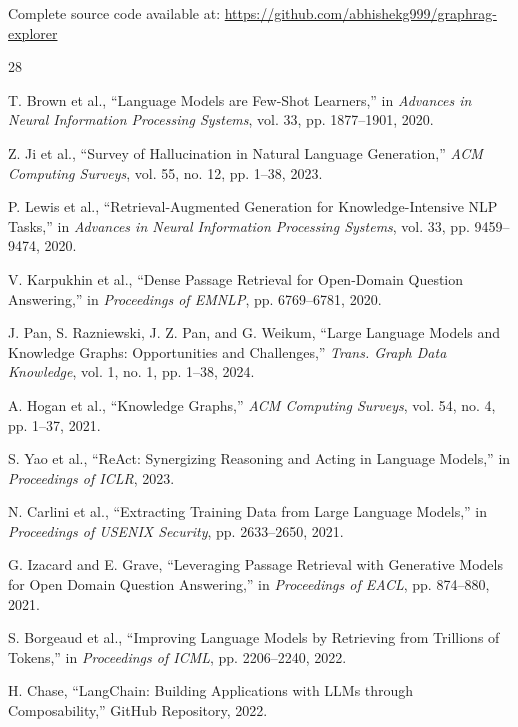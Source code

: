 \documentclass[conference]{IEEEtran}
\begin{document}
Complete source code available at: \url{https://github.com/abhishekg999/graphrag-explorer}


\begin{thebibliography}{28}

T. Brown et al., ``Language Models are Few-Shot Learners,'' in \textit{Advances in Neural Information Processing Systems}, vol. 33, pp. 1877--1901, 2020.

Z. Ji et al., ``Survey of Hallucination in Natural Language Generation,'' \textit{ACM Computing Surveys}, vol. 55, no. 12, pp. 1--38, 2023.

P. Lewis et al., ``Retrieval-Augmented Generation for Knowledge-Intensive NLP Tasks,'' in \textit{Advances in Neural Information Processing Systems}, vol. 33, pp. 9459--9474, 2020.

V. Karpukhin et al., ``Dense Passage Retrieval for Open-Domain Question Answering,'' in \textit{Proceedings of EMNLP}, pp. 6769--6781, 2020.

J. Pan, S. Razniewski, J. Z. Pan, and G. Weikum, ``Large Language Models and Knowledge Graphs: Opportunities and Challenges,'' \textit{Trans. Graph Data Knowledge}, vol. 1, no. 1, pp. 1--38, 2024.

A. Hogan et al., ``Knowledge Graphs,'' \textit{ACM Computing Surveys}, vol. 54, no. 4, pp. 1--37, 2021.

S. Yao et al., ``ReAct: Synergizing Reasoning and Acting in Language Models,'' in \textit{Proceedings of ICLR}, 2023.

N. Carlini et al., ``Extracting Training Data from Large Language Models,'' in \textit{Proceedings of USENIX Security}, pp. 2633--2650, 2021.

G. Izacard and E. Grave, ``Leveraging Passage Retrieval with Generative Models for Open Domain Question Answering,'' in \textit{Proceedings of EACL}, pp. 874--880, 2021.

S. Borgeaud et al., ``Improving Language Models by Retrieving from Trillions of Tokens,'' in \textit{Proceedings of ICML}, pp. 2206--2240, 2022.

H. Chase, ``LangChain: Building Applications with LLMs through Composability,'' GitHub Repository, 2022.


\end{thebibliography}
\end{document}
